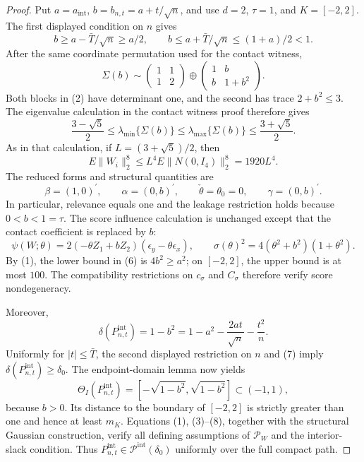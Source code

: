 \documentclass{article}
\begin{document}
\begin{proof}
Put \(a=a_{\mathrm{int}}\), \(b=b_{n,t}=a+t/\sqrt n\), and use \(d=2\), \(\tau=1\), and \(K=[-2,2]\). The first displayed condition on \(n\) gives
\[
 b\geq a-\bar T/\sqrt n\geq a/2,
 \qquad
 b\leq a+\bar T/\sqrt n\leq(1+a)/2<1. \tag{1}
\]
After the same coordinate permutation used for the contact witness,
\[
 \Sigma(b)\sim
 \begin{pmatrix}1&1\\1&2\end{pmatrix}
 \oplus
 \begin{pmatrix}1&b\\b&1+b^2\end{pmatrix}. \tag{2}
\]
Both blocks in (2) have determinant one, and the second has trace \(2+b^2\leq3\). The eigenvalue calculation in the contact witness proof therefore gives
\[
 \frac{3-\sqrt5}{2}\leq\lambda_{\min}\{\Sigma(b)\}
 \leq\lambda_{\max}\{\Sigma(b)\}\leq\frac{3+\sqrt5}{2}. \tag{3}
\]
As in that calculation, if \(L=(3+\sqrt5)/2\), then
\[
 E\|W_i\|_2^8\leq L^4E\|N(0,I_4)\|_2^8=1920L^4. \tag{4}
\]
The reduced forms and structural quantities are
\[
 \beta=(1,0)^{\prime},\qquad
 \alpha=(0,b)^{\prime},\qquad
 \check\theta=\theta_0=0,\qquad
 \gamma=(0,b)^{\prime}. \tag{5}
\]
In particular, relevance equals one and the leakage restriction holds because \(0<b<1=\tau\). The score influence calculation is unchanged except that the contact coefficient is replaced by \(b\):
\[
 \psi(W;\theta)=2(-\theta Z_1+bZ_2)(\epsilon_y-\theta\epsilon_x),
 \qquad
 \sigma(\theta)^2=4(\theta^2+b^2)(1+\theta^2). \tag{6}
\]
By (1), the lower bound in (6) is \(4b^2\geq a^2\); on \([-2,2]\), the upper bound is at most \(100\). The compatibility restrictions on \(c_\sigma\) and \(C_\sigma\) therefore verify score nondegeneracy.

Moreover,
\[
 \delta(P_{n,t}^{\mathrm{int}})=1-b^2
 =1-a^2-\frac{2at}{\sqrt n}-\frac{t^2}{n}. \tag{7}
\]
Uniformly for \(|t|\leq\bar T\), the second displayed restriction on \(n\) and (7) imply \(\delta(P_{n,t}^{\mathrm{int}})\geq\delta_0\). The endpoint-domain lemma now yields
\[
 \Theta_I(P_{n,t}^{\mathrm{int}})
 =[-\sqrt{1-b^2},\sqrt{1-b^2}]\subset(-1,1), \tag{8}
\]
because \(b>0\). Its distance to the boundary of \([-2,2]\) is strictly greater than one and hence at least \(m_K\). Equations (1), (3)--(8), together with the structural Gaussian construction, verify all defining assumptions of \(\mathcal P_W\) and the interior-slack condition. Thus \(P_{n,t}^{\mathrm{int}}\in\mathcal P^{\mathrm{int}}(\delta_0)\) uniformly over the full compact path.


\end{proof}
\end{document}
